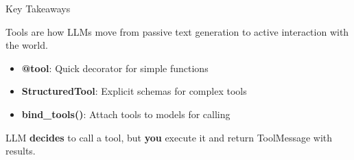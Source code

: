 \documentclass[aspectratio=169,11pt]{beamer}
\begin{document}
\begin{frame}[fragile]{Key Takeaways}
\begin{conceptbox}
Tools are how LLMs move from passive text generation to active interaction with the world.
\end{conceptbox}

\vfill

\begin{tipbox}
\begin{itemize}\setlength{\itemsep}{1pt}
  \item \textbf{@tool}: Quick decorator for simple functions
  \item \textbf{StructuredTool}: Explicit schemas for complex tools
  \item \textbf{bind\_tools()}: Attach tools to models for calling
\end{itemize}
\end{tipbox}

\vfill

\begin{warningbox}[Remember]
LLM \textbf{decides} to call a tool, but \textbf{you} execute it and return ToolMessage with results.
\end{warningbox}
\end{frame}
\end{document}
